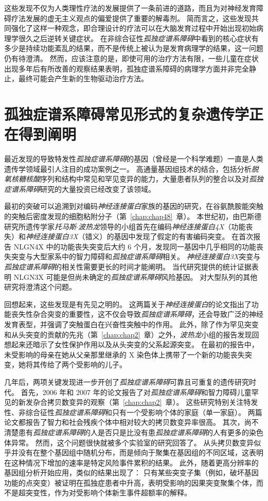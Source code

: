 这些发现不仅为人类理性疗法的发展提供了一条前进的道路，而且为对神经发育障碍疗法发展的虚无主义观点的偏爱提供了重要的解毒剂。
简而言之，这些发现共同强化了这样一种观念，即合理设计的疗法可以在大脑发育过程中开始出现初始病理学很久之后逆转关键症状。
在非综合征性\textit{孤独症谱系障碍}中看到的核心症状有多少是持续功能紊乱的结果，而不是传统上被认为是发育病理学的结果，这一问题仍有待澄清。
然而，应该注意的是，即使可用的治疗方法有限，一些儿童在症状出现多年后有所改善的观察结果表明，孤独症谱系障碍的病理学方面并非完全静止，最终可能会产生新的生物驱动治疗方法。



\section{孤独症谱系障碍常见形式的复杂遗传学正在得到阐明}

最近发现的导致特发性\textit{孤独症谱系障碍}的基因（曾经是一个科学难题）一直是人类遗传学领域最引人注目的成功案例之一。
高通量基因组技术的结合，包括分析\textit{脱氧核糖核酸}序列和结构中常见和罕见变异的能力，大量患者队列的整合以及对\textit{孤独症谱系障碍}研究的大量投资已经改变了该领域。


最初的突破可以追溯到对编码\textit{神经连接蛋白}家族的基因的研究，在谷氨酰胺能突触的突触后密度发现的细胞粘附分子（第~\ref{chap:chap48}~章）。
本世纪初，由巴斯德研究所遗传学家\textit{托马斯$\cdot$波热龙}领导的小组首先在编码\textit{神经连接蛋白4X}（功能丧失）和\textit{神经连接蛋白3X}（错义）的基因中发现了假定的有害编码突变。
在首次报告 NLGN4X 中的功能丧失突变后大约 6 个月，发现同一基因中几乎相同的功能丧失突变与大型家系中的智力障碍和\textit{孤独症谱系障碍}相关。
\textit{神经连接蛋白3X}突变与\textit{孤独症谱系障碍}的相关性需要更长的时间才能阐明。
当代研究提供的统计证据表明 NLGN3X 可能是但尚未确定的\textit{孤独症谱系障碍}风险基因。
对大型队列的其他研究将澄清这个问题。


回想起来，这些发现是有先见之明的。
这两篇关于\textit{神经连接蛋白}的论文指出了功能丧失性杂合突变的重要性，这不仅会导致\textit{孤独症谱系障碍}，还会导致广泛的神经发育表型，并强调了突触蛋白在兴奋性突触中的作用。
此外，除了作为罕见突变和从头突变的贡献的先兆（第~\ref{chap:chap2}~章）之外，\textit{波热龙}小组的报告发现回想起来还暗示了女性保护作用以及从头突变的父系起源突变。
在最初的报告中，未受影响的母亲在她从父亲那里继承的 X 染色体上携带了一个新的功能丧失突变，她将其传给了两个受影响的儿子。


几年后，两项关键发现进一步开创了\textit{孤独症谱系障碍}可靠且可重复的遗传研究时代。
首先，2006 年和 2007 年的论文报告了对\textit{孤独症谱系障碍}和智力障碍儿童罕见的新发杂合拷贝数变异的观察（第~\ref{chap:chap2}~章）。
这些研究特别关注特发性、非综合征性\textit{孤独症谱系障碍}和只有一个受影响个体的家庭（单一家庭）。
两篇论文都报告了智力和社会残疾个体中相对较大的拷贝数变异率很高。
其次，尚不清楚患有\textit{孤独症谱系障碍}的人是否只是比没有患\textit{孤独症谱系障碍}的人有更多的染色体异常。
然而，这个问题很快就被多个实验室的研究回答了。
从头拷贝数变异似乎并没有在整个基因组中随机分布，而是倾向于聚集在基因组的不同区域，这表明在这种情况下增加的速率是特定风险事件累积的结果。
此外，随着更高分辨率的基因组分析开始应用，类似的结果出现了：
只有某些突变子集（例如，破坏基因功能的点突变）被证明在孤独症患者中升高，表明受影响的因果突变聚集个体，而不是超突变性，作为对受影响个体新生事件超额率的解释。


